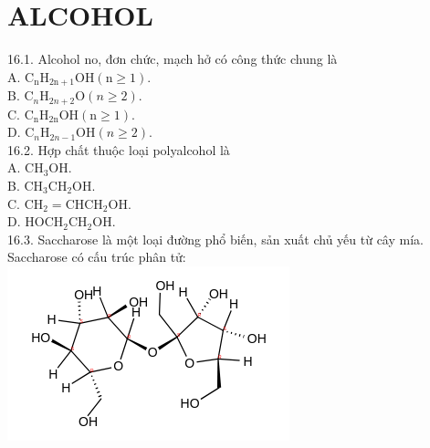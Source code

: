 \documentclass[10pt]{article}
\begin{document}
\section*{ALCOHOL}
16.1. Alcohol no, đơn chức, mạch hở có công thức chung là\\
A. $\mathrm{C}_{\mathrm{n}} \mathrm{H}_{2 \mathrm{n}+1} \mathrm{OH}(\mathrm{n} \geq 1)$.\\
B. $\mathrm{C}_{n} \mathrm{H}_{2 n+2} \mathrm{O}(n \geq 2)$.\\
C. $\mathrm{C}_{\mathrm{n}} \mathrm{H}_{2 \mathrm{n}} \mathrm{OH}(\mathrm{n} \geq 1)$.\\
D. $\mathrm{C}_{n} \mathrm{H}_{2 n-1} \mathrm{OH}(n \geq 2)$.\\
16.2. Hợp chất thuộc loại polyalcohol là\\
A. $\mathrm{CH}_{3} \mathrm{OH}$.\\
B. $\mathrm{CH}_{3} \mathrm{CH}_{2} \mathrm{OH}$.\\
C. $\mathrm{CH}_{2}=\mathrm{CHCH}_{2} \mathrm{OH}$.\\
D. $\mathrm{HOCH}_{2} \mathrm{CH}_{2} \mathrm{OH}$.\\
16.3. Saccharose là một loại đường phổ biến, sản xuất chủ yếu từ cây mía. Saccharose có cấu trúc phân tử:\\
\includegraphics{smile-4583433c6dc1b3a942dd52825048e43916bb74a2}
\end{document}
